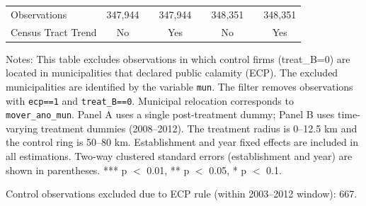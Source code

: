 \begin{table}[htb]
{\begin{threeparttable}
\begin{tabular}{lccccccc}
    Observations & 347{,}944 &  & 347{,}944 &  & 348{,}351 &  & 348{,}351\\
    Census Tract Trend & No &  & Yes &  & No &  & Yes\\
    \bottomrule
    \end{tabular}%
   	\begin{tablenotes}[flushleft] \item \small Notes: This table excludes observations in which control firms (treat\_B=0) are located in municipalities that declared public calamity (ECP). The excluded municipalities are identified by the variable \texttt{mun}. The filter removes observations with \texttt{ecp==1} and \texttt{treat\_B==0}. Municipal relocation corresponds to \texttt{mover\_ano\_mun}. Panel A uses a single post-treatment dummy; Panel B uses time-varying treatment dummies (2008--2012). The treatment radius is 0--12.5 km and the control ring is 50--80 km. Establishment and year fixed effects are included in all estimations. Two-way clustered standard errors (establishment and year) are shown in parentheses. *** p $<$ 0.01, ** p $<$ 0.05, * p $<$ 0.1. 
   	\item \small Control observations excluded due to ECP rule (within 2003--2012 window): 667.
   	\end{tablenotes}
   	\end{threeparttable}
   	}
\end{table}%
